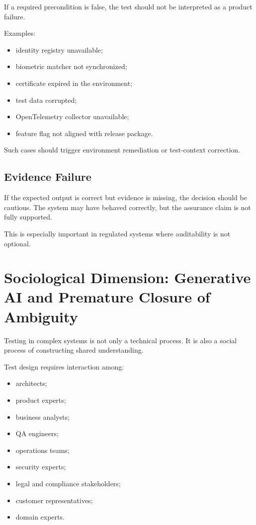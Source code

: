 \documentclass[11pt,a4paper]{article}
\begin{document}
If a required precondition is false, the test should not be interpreted as a product failure.

Examples:
\begin{itemize}
\item identity registry unavailable;
\item biometric matcher not synchronized;
\item certificate expired in the environment;
\item test data corrupted;
\item OpenTelemetry collector unavailable;
\item feature flag not aligned with release package.
\end{itemize}

Such cases should trigger environment remediation or test-context correction.

\subsection{Evidence Failure}

If the expected output is correct but evidence is missing, the decision should be cautious. The system may have behaved correctly, but the assurance claim is not fully supported.

This is especially important in regulated systems where auditability is not optional.

\section{Sociological Dimension: Generative AI and Premature Closure of Ambiguity}

Testing in complex systems is not only a technical process. It is also a social process of constructing shared understanding.

Test design requires interaction among:
\begin{itemize}
\item architects;
\item product experts;
\item business analysts;
\item QA engineers;
\item operations teams;
\item security experts;
\item legal and compliance stakeholders;
\item customer representatives;
\item domain experts.
\end{itemize}
\end{document}
